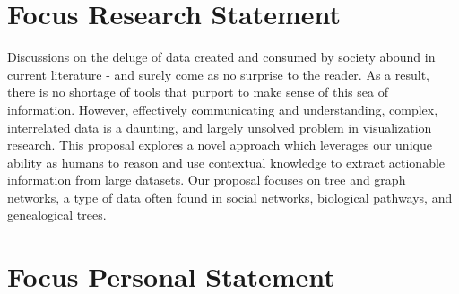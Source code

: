 \documentclass[timesfont,runinheadings]{nsfgrfp}
\begin{document}
\section*{Focus Research Statement}

  Discussions on the deluge of data created and consumed by society abound in current literature - and surely come as no surprise to the reader. As a result, there is no shortage of tools that purport to make sense of this sea of information. However, effectively communicating and understanding, complex, interrelated data is a daunting, and largely unsolved problem in visualization research. This proposal explores a novel approach which leverages our unique ability as humans to reason and use contextual knowledge to extract actionable information from large datasets. Our proposal focuses on tree and graph networks, a type of data often found in social networks,  biological pathways, and genealogical trees.
  
  
  
  
 
 
 

\section*{Focus Personal Statement}
\end{document}

